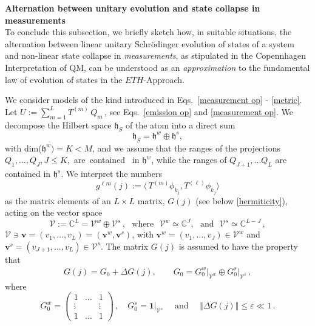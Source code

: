 \documentclass[a4paper,11pt]{article}
\begin{document}
{{\bf{Alternation between unitary evolution and state collapse in measurements}}\\

To conclude this subsection, we briefly sketch how, in suitable situations, the alternation between linear unitary 
Schr\"odinger evolution of states of a system and non-linear state collapse
 in \textit{measurements}, as stipulated in the Copennhagen Interpretation of QM, can be understood as 
 an \textit{approximation} to the fundamental law of evolution of states in the $ETH$-Approach.

We consider models of the kind introduced in Eqs.~\eqref{measurement op} - \eqref{metric}. 
 Let $U:= \sum_{m=1}^{L} T^{(m)}\,Q_{m}$\,, see  Eqs.~\eqref{emission op} and \eqref{measurement op}.
We decompose the Hilbert space $\mathfrak{h}_S$ of the atom into a direct sum
\begin{equation}\label{dec}
\mathfrak{h}_S = \mathfrak{h}^{w} \oplus \mathfrak{h}^{s}, 
\end{equation}
with dim($\mathfrak{h}^{w}) = K < M$, and we assume that the ranges of the projections $Q_1, \dots, Q_J, J\leq K,$ 
\mbox{are contained } in $\mathfrak{h}^{w}$, while the ranges of $Q_{J+1}, \dots Q_L$ are contained in $\mathfrak{h}^{s}$. 
We interpret the numbers
$$g^{\ell m}(j):=  \langle \,T^{(m)}\phi_{k_j}, T^{(\ell)} \phi_{k_j}\rangle$$
as the matrix elements of an $L\times L$ matrix, $G(j)$ (see below \eqref{hermiticity}), acting on the vector space 
$$\mathcal{V}:=\mathbb{C}^{L}= \mathcal{V}^{w} \oplus \mathcal{V}^{s}\,,\,\, \text{ where }\,\, \mathcal{V}^{w}\simeq 
\mathbb{C}^{J},\,\, \text{ and }\,\, \mathcal{V}^{s}\simeq \mathbb{C}^{L-J}\,,$$
$\mathcal{V} \ni \mathbf{v}=(v_1,\dots, v_L) = (\mathbf{v}^{w}, \mathbf{v}^{s})$, with 
$\mathbf{v}^{w}=(v_1, \dots, v_J)\in \mathcal{V}^{w}$ and $\mathbf{v}^{s}=(v_{J+1}, \dots, v_{L})\in \mathcal{V}^{s}$.
The matrix $G(j)$ is assumed to have the property that
\begin{align}\label{metric ex}
G(j) = G_{0} + \Delta G(j), \qquad G_{0}= G_{0}^{w}\vert_{\mathcal{V}^{w}} \oplus G_{0}^{s}\vert_{\mathcal{V}^{s}}\,,
\end{align}
where
\begin{equation}\label{matrices}
G_{0}^{w} = \begin{pmatrix} 1& \hdots & 1\\ \vdots & & \vdots \\ 1& \hdots &1 \end{pmatrix}\,, \quad
G_{0}^{s} = \mathbf{1}\vert_{\mathcal{V}^{s}}\quad \text{  and  }\quad \Vert \Delta G(j) \Vert \leq \varepsilon \ll 1\,.

\end{equation}}
\end{document}
